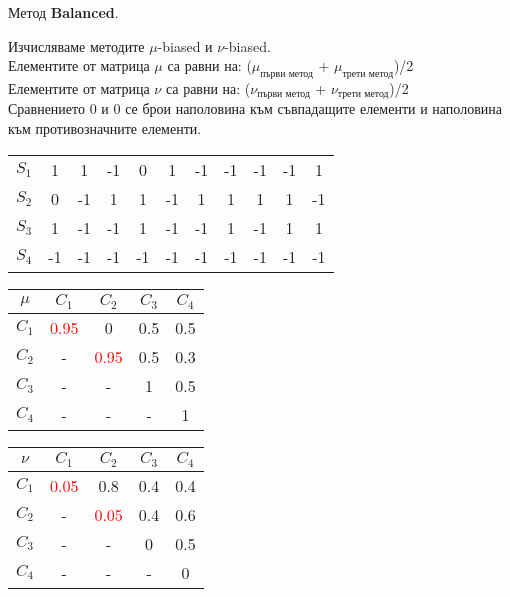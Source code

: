 \documentclass{beamer}
\begin{document}
\begin{frame}
Метод \textbf{Balanced}.

\bigskip
Изчисляваме методите $\mu$-biased и $\nu$-biased.\\
Елементите от матрица $\mu$ са равни на: ($\mu_{\text{първи метод}}$ + $\mu_{\text{трети метод}}$)/2\\
Елементите от матрица $\nu$ са равни на: ($\nu_{\text{първи метод}}$ + $\nu_{\text{трети метод}}$)/2\\
Сравнението $0$ и $0$ се брои наполовина към съвпадащите елементи и наполовина към противозначните елементи.

\begin{center}
\begin{tabular}{c|cccccccccc}
& & & & & & & & & & \\
\hline $S_1$ & 1 & 1 & -1 & 0 & 1 & -1 & -1 & -1 & -1 & 1 \\
$S_2$ & 0 & -1 & 1 & 1 & -1 & 1 & 1 & 1 & 1 & -1 \\
$S_3$ & 1 & -1 & -1 & 1 & -1 & -1 & 1 & -1 & 1 & 1 \\
$S_4$ & -1 & -1 & -1 & -1 & -1 & -1 & -1 & -1 & -1 & -1
\end{tabular}
\end{center}

\begin{center}
\begin{minipage}[b]{0.4\linewidth}
\begin{tabular}{c|cccc}
$\mu$ & $C_1$ & $C_2$ & $C_3$ & $C_4$ \\
\hline $C_1$ & \textcolor{red}{0.95} & 0 & 0.5 & 0.5 \\
$C_2$ & - & \textcolor{red}{0.95} & 0.5 & 0.3 \\
$C_3$ & - & - & 1 & 0.5 \\
$C_4$ & - & - & - & 1
\end{tabular}
\end{minipage}
\begin{minipage}[b]{0.4\linewidth}
\begin{tabular}{c|cccc}
$\nu$ & $C_1$ & $C_2$ & $C_3$ & $C_4$ \\
\hline $C_1$ & \textcolor{red}{0.05} & 0.8 & 0.4 & 0.4 \\
$C_2$ & - & \textcolor{red}{0.05} & 0.4 & 0.6 \\
$C_3$ & - & - & 0 & 0.5 \\
$C_4$ & - & - & - & 0
\end{tabular}
\end{minipage}
\end{center}
\end{frame}
\end{document}
